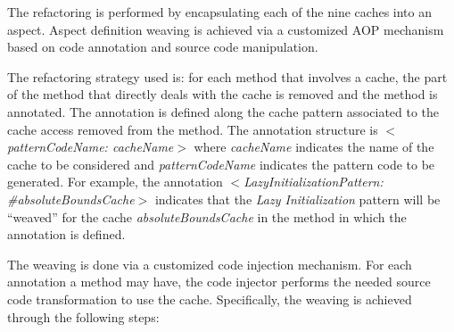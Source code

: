 \documentclass[preprint,10pt]{sigplanconf}
\begin{document}
The refactoring is performed by encapsulating each of the nine caches into an aspect. Aspect definition weaving is achieved via a customized AOP mechanism based on code annotation and source code manipulation.


The refactoring strategy used is: for each method that involves a cache, the part of the method that directly deals with the cache is removed and the method is annotated.
The annotation is defined along the cache pattern associated to the cache access removed from the method.
The annotation structure is \emph{$<$patternCodeName: cacheName$>$} where \emph{cacheName} indicates the name of the cache to be considered and \emph{patternCodeName} indicates the pattern code to be generated. For example, the annotation \emph{$<$LazyInitializationPattern: \#absoluteBoundsCache$>$} indicates that the \emph{Lazy Initialization} pattern will be ``weaved'' for the cache \emph{absoluteBoundsCache} in the method in which the annotation is defined.

The weaving is done via a customized code injection mechanism. For each annotation a method may have, the code injector performs the needed source code transformation to use the cache. Specifically, the weaving is achieved through the following steps:
\end{document}
